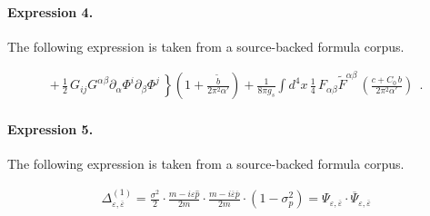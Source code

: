 \documentclass[11pt]{article}
\begin{document}
\paragraph{Expression 4.} The following expression is taken from a source-backed formula corpus.

\begin{align*}+\,\left.\frac{1}{2} \,G_{ij} G^{\alpha \beta} \partial_{\alpha} \Phi^i \partial_{\beta} \Phi^j \,\right\}\left( 1 + \frac{{\tilde{b}}}{2 \pi^2 \alpha '}\right)+ \frac{1}{8\pi g_s} \int d^4 x\, \frac{1}{4}\,F_{\alpha \beta} {\widetilde{F}}^{\alpha \beta}\,\left(\frac{c + C_0\,b }{2 \pi^2 \alpha'} \right)~~.\end{align*}

\paragraph{Expression 5.} The following expression is taken from a source-backed formula corpus.

\begin{align*}\Delta _{\varepsilon ,\overline{\varepsilon }}^{(1)}=\frac{\sigma^2}2\cdot \frac{m-i\varepsilon \widehat{p}}{2m}\cdot\frac{m-i\overline{\varepsilon } \overline{p}}{2m}\cdot \left(1-\sigma _p^2\right) =\Psi _{\varepsilon , \overline{\varepsilon}}\cdot \overline{\Psi }_{\varepsilon ,\overline{ \varepsilon }}\end{align*}
\end{document}
